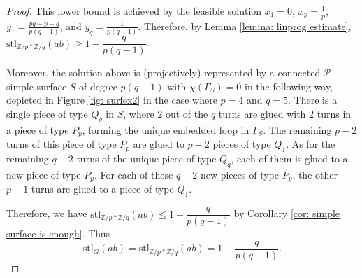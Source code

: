 \documentclass{amsart}
\theoremstyle{definition}
\numberwithin{equation}{section}
\theoremstyle{theorem}
\theoremstyle{remark}
\newcounter{joecomments}
\newcommand{\jcomm}[1]{\textbf{\color{blue}(J\arabic{joecomments})} \marginpar{\scriptsize\raggedright\textbf{\color{blue}(J\arabic{joecomments})Joe: }#1}
	\addtocounter{joecomments}{1}}
\def\Z{\mathbb Z}
\def\stl{\mathrm{stl}}
\begin{document}
\begin{proof}
		
		
		
	
	    This lower bound is achieved by the feasible solution $x_1=0$, $x_p=\frac{1}{p}$, $y_1=\frac{pq-p-q}{p(q-1)}$, and $y_q=\frac{1}{p(q-1)}$. Therefore, by Lemma \ref{lemma: linprog estimate}, $\stl_{\Z/p*\Z/q}(ab)\geq 1-\dfrac{q}{p(q-1)}$. %
	    
	    Moreover, the solution above is (projectively) represented by a connected $\mathcal{P}$-simple surface $S$ of degree $p(q-1)$ with $\chi(\Gamma_S)=0$ in the following way, depicted in Figure \ref{fig: surfex2} in the case where $p=4$ and $q=5$. There is a single piece of type $Q_q$ in $S$, where $2$ out of the $q$ turns are glued with $2$ turns in a piece of type $P_p$, forming the unique embedded loop in $\Gamma_S$. The remaining $p-2$ turns of this piece of type $P_p$ are glued to $p-2$ pieces of type $Q_1$. As for the remaining $q-2$ turns of the unique piece of type $Q_q$, each of them is glued to a new piece of type $P_p$. For each of these $q-2$ new pieces of type $P_p$, the other $p-1$ turns are glued to a piece of type $Q_1$.
	    
	    Therefore, we have $\stl_{\Z/p*\Z/q}(ab)\leq 1-\dfrac{q}{p(q-1)}$ by Corollary \ref{cor: simple surface is enough}. Thus 
	    $$\stl_G(ab)=\stl_{\Z/p*\Z/q}(ab)= 1-\frac{q}{p(q-1)}.$$
	\end{proof}
\end{document}
